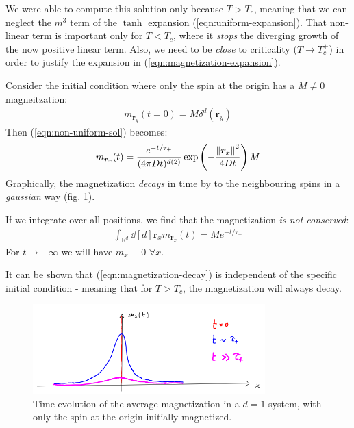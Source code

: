 \documentclass[../../main.tex]{subfiles}
\begin{document}
We were able to compute this solution only because $T > T_c$, meaning that we can neglect the $m^3$ term of the $\tanh$ expansion (\ref{eqn:uniform-expansion}). That non-linear term is important only for $T < T_c$, where it \textit{stops} the diverging growth of the now positive linear term. Also, we need to be \textit{close} to criticality ($T \to T_c^+$) in order to justify the expansion in (\ref{eqn:magnetization-expansion}). 

\begin{example}
    Consider the initial condition where only the spin at the origin has a $M \neq 0$ magneitzation:
    \begin{align*}
        m_{\bm{r}_y}(t=0) = M \delta^d(\bm{r}_y)
    \end{align*}
    Then (\ref{eqn:non-uniform-sol}) becomes:
    \begin{align*}
        m_{\bm{r}_x}(t) = \frac{e^{-t/\tau_+}}{(4 \pi D t)^{d(2)}} \exp\left(-\frac{\norm{\bm{r}_x}^2}{4 D t} \right) M
    \end{align*}
    Graphically, the magnetization \textit{decays} in time by  to the neighbouring spins in a \textit{gaussian} way (fig. \ref{fig:single-magnetized-evo}). 
    
    \medskip

    If we integrate over all positions, we find that the magnetization \textit{is not conserved}: 
    \begin{align}\label{eqn:magnetization-decay}
        \int_{\mathbb{R}^d} \dd[d]{\bm{r}_x} m_{\bm{r}_x}(t) = M e^{-t/\tau_+}
    \end{align}
    For $t \to +\infty$ we will have $m_{x} \equiv 0$ $\forall x$.

    \medskip

    It can be shown that (\ref{eqn:magnetization-decay}) is independent of the specific initial condition - meaning that for $T > T_c$, the magnetization will always decay.
\end{example}

\begin{figure}[H]
    \centering
    \includegraphics[width=0.8\textwidth]{single-magnetized-evo.png}
    \caption{Time evolution of the average magnetization in a $d=1$ system, with only the spin at the origin initially magnetized.}
    \label{fig:single-magnetized-evo}
\end{figure}
\end{document}
